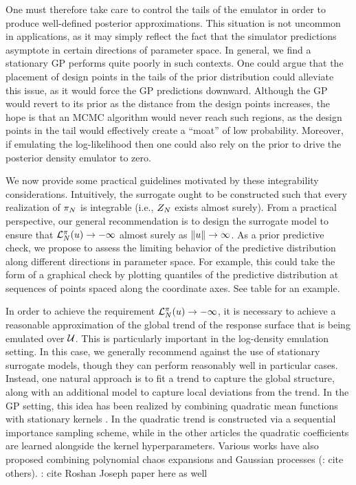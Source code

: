 \documentclass[12pt]{article}
\begin{document}
One must therefore take care to control the tails of the emulator in order to produce well-defined
posterior approximations. This situation is not uncommon in applications, as it may simply reflect the 
fact that the simulator predictions asymptote in certain directions of parameter space. 
In general, we find a stationary GP performs quite poorly in such contexts. One could argue that 
the placement of design points in the tails of the prior distribution could alleviate this issue, 
as it would force the GP predictions downward. Although the GP would revert to its prior
as the distance from the design points increases, the hope is  
that an MCMC algorithm would never reach such regions, as the design points in the tail
would effectively create a ``moat'' of low probability.
Moreover, if emulating the log-likelihood then one could also rely on the prior to drive the posterior 
density emulator to zero.


We now provide some practical guidelines motivated by these integrability considerations.
Intuitively, the surrogate ought to be constructed such that every realization of $\postEm[\Ndesign]$
is integrable (i.e., $\normCstEm$ exists almost surely). From a practical perspective, our general 
recommendation is to design the surrogate model to ensure that $\lpostEm[\Ndesign](\Par) \to -\infty$
almost surely as $\norm{\Par} \to \infty$. As a prior predictive check, we propose to   
assess the limiting behavior of the predictive distribution along different directions in parameter
space. For example, this could take the form of a graphical check by plotting quantiles of 
the predictive distribution at sequences of points spaced along the coordinate axes. 
See table \todo for an example. 

In order to achieve the requirement $\lpostEm[\Ndesign](\Par) \to -\infty$, it is 
necessary to achieve a reasonable approximation of the global trend of the response 
surface that is being emulated over $\parSpace$. This is particularly important in the
log-density emulation setting. In this case, we generally recommend against the use of 
stationary surrogate models, though they can perform reasonably well in particular cases.
Instead, one natural approach is to fit a trend to capture the global structure, along with an 
additional model to capture local deviations from the trend. In the GP setting, this idea has 
been realized by combining quadratic mean functions with stationary kernels 
\citep{emPostDens,SinsbeckNowak,VehtariParallelGP,llikEmABC,ABCGP,pseudoMarginalGP}. In 
\citet{emPostDens} the quadratic trend is constructed via a sequential importance sampling
scheme, while in the other articles the quadratic coefficients are learned alongside the 
kernel hyperparameters. Various works have also proposed combining polynomial chaos
expansions and Gaussian processes \citep{SinsbeckNowak} (\todo: cite others).
\todo: cite Roshan Joseph paper here as well
\end{document}
